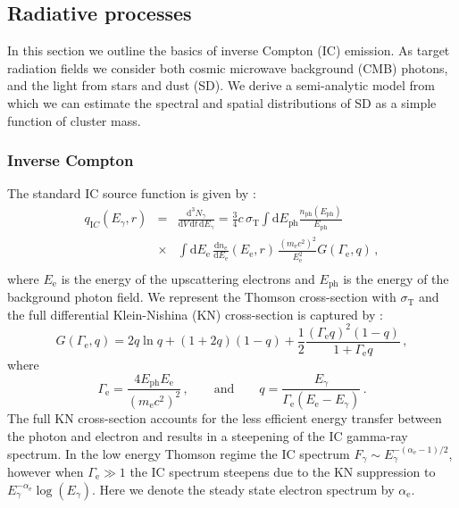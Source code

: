 \documentclass[10pt,aps,pra,reprint,amsmath,amsfonts,amssymb,showpacs]{revtex4-1}
\newcommand{\rmn}{\mathrm}
\newcommand{\ph}{\rmn{ph}}
\newcommand{\eph}{E_\ph}
\newcommand{\ee}{E_\rmn{e}}
\newcommand{\dd}{\rmn{d}}
\newcommand{\e}{\rmn{e}}
\newcommand{\eg}{E_\gamma}
\begin{document}
\subsection{Radiative processes}
In this section we outline the basics of inverse Compton (IC)
emission. As target radiation fields we consider both cosmic microwave
background (CMB) photons, and the light from stars and dust (SD). We
derive a semi-analytic model from which we can estimate the spectral
and spatial distributions of SD as a simple function of cluster mass.

\subsubsection{Inverse Compton}
\label{sect:IC}
The standard IC source function is given by
\cite{1979rpa..book.....R}:
\begin{eqnarray}
  q_{\rmn IC}(\eg, r) &=&  \frac{\dd^3 N_\gamma}{\dd V\,\dd t\,\dd \eg} = 
 \frac{3}{4}c\,\sigma_\rmn{T}
\int\dd \eph \frac{n_\rmn{ph}(\eph)}{\eph}\nonumber\\
&\times& \int \dd \ee\,\frac{\dd n_\e}{\dd \ee}(\ee,r)\,
 \frac{\left(m_\e c^2\right)^2}{\ee^2}G(\Gamma_\e,q)\,,\nonumber\\
  \label{eq:ICemiss}
\end{eqnarray}
where $\ee$ is the energy of the upscattering electrons and $\eph$ is
the energy of the background photon field. We represent the Thomson
cross-section with $\sigma_\rmn{T}$ and the full differential
Klein-Nishina (KN) cross-section is captured by
\cite{1970RvMP...42..237B}:
\begin{equation}
\label{eq:KN_spec}
G(\Gamma_\e,q) = 2q\ln{q}+(1+2q)(1-q)+ 
\frac{1}{2}\frac{\left(\Gamma_\e q\right)^2\left(1-q\right)}
     {1+\Gamma_\e q}\,,
\end{equation}
where
\begin{equation}
\Gamma_\e=\frac{4\eph \ee}{\left(m_\e c^2\right)^2}\,,\qquad \rmn{and} \qquad  
q=\frac{\eg}{\Gamma_\e\left(\ee-\eg\right)}\,.
\end{equation}
The full KN cross-section accounts for the less efficient energy
transfer between the photon and electron and results in a steepening
of the IC gamma-ray spectrum. In the low energy Thomson regime the IC
spectrum $F_\gamma\sim E_\gamma^{-(\alpha_\e-1)/2}$, however when
$\Gamma_\e \gg 1$ the IC spectrum steepens due to the KN suppression
to $\eg^{-\alpha_\e}\log(\eg)$. Here we denote the steady
state electron spectrum by $\alpha_\e$.
\end{document}
